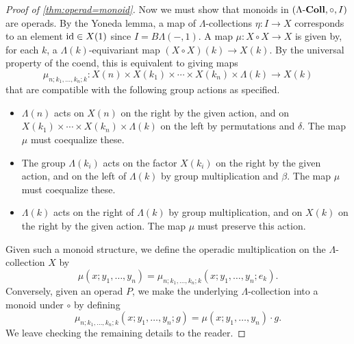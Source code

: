 \begin{proof}[Proof of \cref{thm:operad=monoid}]

Now we must show that monoids in $(\Lambda\mbox{-}\mathbf{Coll}, \circ, I)$ are operads. By the Yoneda lemma, a map of $\Lambda$-collections $\eta \colon I \rightarrow X$ corresponds to an element $\textrm{id} \in X(1)$ since $I = B\Lambda(-,1)$. A map $\mu \colon X \circ X \rightarrow X$ is given by, for each $k$, a $\Lambda(k)$-equivariant map $(X \circ X) (k) \rightarrow X(k)$. By the universal property of the coend, this is equivalent to giving maps
  \[
  \mu_{n; k_1, \ldots, k_n;k} \colon X(n) \times X(k_{1}) \times \cdots \times X(k_{n}) \times \Lambda(k) \to X(k)
  \]
that are compatible with the following group actions as specified.
\begin{itemize}
\item $\Lambda(n)$ acts on $X(n)$ on the right by the given action, and on $X(k_1) \times \cdots \times X(k_n) \times \Lambda(k)$ on the left by permutations and $\delta$. The map $\mu$ must coequalize these.
\item The group $\Lambda(k_i)$ acts on the factor $X(k_i)$ on the right by the given action, and on the left of $\Lambda(k)$ by group multiplication and $\beta$. The map $\mu$ must coequalize these.
\item $\Lambda(k)$ acts on the right of $\Lambda(k)$ by group multiplication, and on $X(k)$ on the right by the given action. The map $\mu$ must preserve this action.
\end{itemize}
Given such a monoid structure, we define the operadic multiplication on the $\Lambda$-collection $X$ by
\[
    \mu (x; y_{1}, \ldots, y_{n}) = \mu_{n; k_1, \ldots, k_n; k}(x; y_{1}, \ldots, y_{n}; e_{k}).
  \]
Conversely, given an operad $P$, we make the underlying $\Lambda$-collection into a monoid under $\circ$ by defining
\[
 \mu_{n; k_1, \ldots, k_n; k}(x; y_{1}, \ldots, y_{n}; g) =  \mu (x; y_{1}, \ldots, y_{n}) \cdot g.
\]
We leave checking the remaining details to the reader.
\end{proof}




